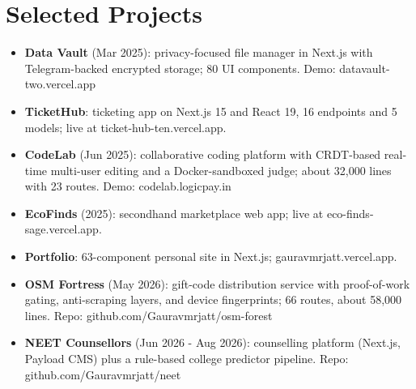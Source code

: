 \documentclass[11pt,a4paper,sans]{moderncv}
\begin{document}
\vspace{1pt}



\section{Selected Projects}
\vspace{1pt}
\begin{itemize}
    \item {\textbf{Data Vault} (Mar 2025): privacy-focused file manager in Next.js with Telegram-backed encrypted storage; 80 UI components. Demo: datavault-two.vercel.app}
    \item {\textbf{TicketHub}: ticketing app on Next.js 15 and React 19, 16 endpoints and 5 models; live at ticket-hub-ten.vercel.app.}
    \item {\textbf{CodeLab} (Jun 2025): collaborative coding platform with CRDT-based real-time multi-user editing and a Docker-sandboxed judge; about 32,000 lines with 23 routes. Demo: codelab.logicpay.in}
    \item {\textbf{EcoFinds} (2025): secondhand marketplace web app; live at eco-finds-sage.vercel.app.}
    \item {\textbf{Portfolio}: 63-component personal site in Next.js; gauravmrjatt.vercel.app.}
    \item {\textbf{OSM Fortress} (May 2026): gift-code distribution service with proof-of-work gating, anti-scraping layers, and device fingerprints; 66 routes, about 58,000 lines. Repo: github.com/Gauravmrjatt/osm-forest}
    \item {\textbf{NEET Counsellors} (Jun 2026 - Aug 2026): counselling platform (Next.js, Payload CMS) plus a rule-based college predictor pipeline. Repo: github.com/Gauravmrjatt/neet}
\end{itemize}
\end{document}
